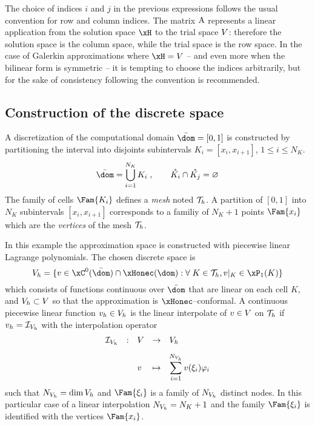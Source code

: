 \medskip
\begin{rmrk}
The choice of indices $i$ and $j$ in the previous expressions follows the usual convention for row and column indices. The matrix ${\mathrm A}$ represents a linear application from the solution space $\xH$ to the trial space ${V}$: therefore the solution space is the column space, while the trial space is the row space.
In the case of Galerkin approximations where $\xH = \xV$ -- and even more when the bilinear form is symmetric -- it is tempting to choose the indices arbitrarily, but for the sake of consistency following the convention is recommended.
\end{rmrk}

\subsection{Construction of the discrete space}

A discretization of the computational domain $\bar\dom = [0,1]$ is constructed by partitioning the interval into disjoints subintervals $K_i = [x_{i}, x_{i+1}]$, $1\leq i \leq N_K$.
\begin{equation*}
\bar\dom = \displaystyle\Union_{i = 1}^{N_K} K_i\;,\qquad \Interior{K_i}\cap \Interior{K_j} = \Empty
\end{equation*}
The family of cells $\Fam{K_i}$ defines a \textit{mesh} noted ${\mathcal T}_h$.
A partition of $[0,1]$ into $N_K$ subintervals $[x_i, x_{i+1}]$ corresponds to a familiy of $N_K+1$ points $\Fam{x_i}$ which are the \textit{vertices} of the mesh ${\mathcal T}_h$.

\medskip
In this example the approximation space is constructed with piecewise linear Lagrange polynomials.
The chosen discrete space is
\begin{equation}\label{sp:lagrangeP1}
\xVh = \lbrace v \in \xC^0(\bar\dom)\cap\xHonec(\dom) : \forany K \in \meshT, v\rvert_{K} \in \xPone(K) \rbrace
\end{equation}
which consists of functions continuous over $\bar\dom$ that are linear on each cell $K$, and ${{V}}_h \subset {V}$ so that the approximation is $\xHonec$--conformal.
A continuous piecewise linear function $v_h \in {{V}}_h$ is the linear interpolate of $v\in{V}$ on ${\mathcal T}_h$ if $v_h = \mathop{\mathcal{I}_{{{V}}_h}}$ with the interpolation operator
\begin{equation}\label{fem:lagrange_interpolator}
\begin{array}{lclcl}
\mathop{\mathcal{I}_{{{V}}_h}} &:& {V} &\rightarrow& {{V}}_h\\[2ex]
           & & v   &\mapsto    & \displaystyle\sum_{i=1}^{{N_{{{V}}_h}}} v(\xi_i) \varphi_i
\end{array}
\end{equation}
such that ${N_{{{V}}_h}} = \dim{{{V}}_h}$ and $\Fam{\xi_i}$ is a family of ${N_{{{V}}_h}}$ distinct nodes.
In this particular case of a linear interpolation ${N_{{{V}}_h}} = N_K + 1$ and the family $\Fam{\xi_i}$ is identified with the vertices $\Fam{x_i}$.

